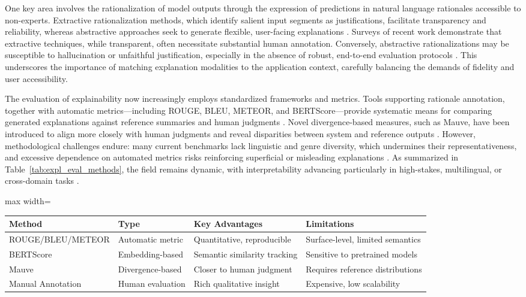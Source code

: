 One key area involves the rationalization of model outputs through the expression of predictions in natural language rationales accessible to non-experts. Extractive rationalization methods, which identify salient input segments as justifications, facilitate transparency and reliability, whereas abstractive approaches seek to generate flexible, user-facing explanations \cite{ref63,ref64,ref65,ref83}. Surveys of recent work demonstrate that extractive techniques, while transparent, often necessitate substantial human annotation. Conversely, abstractive rationalizations may be susceptible to hallucination or unfaithful justification, especially in the absence of robust, end-to-end evaluation protocols \cite{ref39,ref64,ref83,ref106}. This underscores the importance of matching explanation modalities to the application context, carefully balancing the demands of fidelity and user accessibility.

The evaluation of explainability now increasingly employs standardized frameworks and metrics. Tools supporting rationale annotation, together with automatic metrics—including ROUGE, BLEU, METEOR, and BERTScore—provide systematic means for comparing generated explanations against reference summaries and human judgments \cite{ref36,ref38,ref46,ref62,ref80,ref82,ref83,ref103}. Novel divergence-based measures, such as Mauve, have been introduced to align more closely with human judgments and reveal disparities between system and reference outputs \cite{ref68}. However, methodological challenges endure: many current benchmarks lack linguistic and genre diversity, which undermines their representativeness, and excessive dependence on automated metrics risks reinforcing superficial or misleading explanations \cite{ref47,ref106}. As summarized in Table~\ref{tab:expl_eval_methods}, the field remains dynamic, with interpretability advancing particularly in high-stakes, multilingual, or cross-domain tasks \cite{ref39,ref47,ref63,ref82,ref106}.

\begin{table*}[htbp]
\centering
\caption{Overview of major explainability evaluation methods and their key characteristics}
\label{tab:expl_eval_methods}
\begin{adjustbox}{max width=\textwidth}
\begin{tabular}{@{}llll@{}}
\toprule
\textbf{Method}   & \textbf{Type}      & \textbf{Key Advantages}        & \textbf{Limitations}              \\
\midrule
ROUGE/BLEU/METEOR & Automatic metric   & Quantitative, reproducible     & Surface-level, limited semantics  \\
BERTScore         & Embedding-based    & Semantic similarity tracking   & Sensitive to pretrained models    \\
Mauve             & Divergence-based   & Closer to human judgment       & Requires reference distributions  \\
Manual Annotation & Human evaluation   & Rich qualitative insight       & Expensive, low scalability        \\
\bottomrule
\end{tabular}
\end{adjustbox}
\end{table*}

